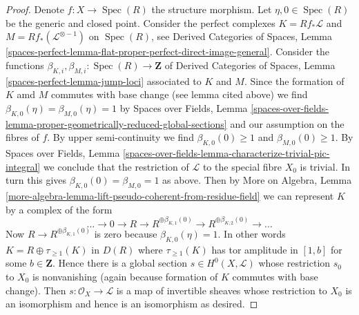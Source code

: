 \documentclass[10pt,a4paper]{amsart}
\theoremstyle{plain}
\theoremstyle{definition}
\theoremstyle{remark}
\numberwithin{equation}{subsection}
\def\Spec{\mathop{\mathrm{Spec}}}
\begin{document}
\begin{proof}
\medskip\noindent
Denote $f : X \to \Spec(R)$ the structure morphism.
Let $\eta, 0 \in \Spec(R)$ be the generic and closed point.
Consider the perfect complexes
$K = Rf_*\mathcal{L}$ and $M = Rf_*(\mathcal{L}^{\otimes -1})$
on $\Spec(R)$, see Derived Categories of Spaces, Lemma
\ref{spaces-perfect-lemma-flat-proper-perfect-direct-image-general}.
Consider the functions
$\beta_{K, i}, \beta_{M, i} : \Spec(R) \to \mathbf{Z}$
of Derived Categories of Spaces, Lemma
\ref{spaces-perfect-lemma-jump-loci} associated to $K$ and $M$.
Since the formation of $K$ amd $M$ commutes with
base change (see lemma cited above) we find
$\beta_{K, 0}(\eta) = \beta_{M, 0}(\eta) = 1$ by
Spaces over Fields, Lemma
\ref{spaces-over-fields-lemma-proper-geometrically-reduced-global-sections}
and our assumption on the fibres of $f$.
By upper semi-continuity we find
$\beta_{K, 0}(0) \geq 1$ and $\beta_{M, 0}(0) \geq 1$.
By 
Spaces over Fields, Lemma
\ref{spaces-over-fields-lemma-characterize-trivial-pic-integral}
we conclude that the restriction of $\mathcal{L}$
to the special fibre $X_0$ is trivial. In turn this gives
$\beta_{K, 0}(0) = \beta_{M, 0} = 1$ as above.
Then by More on Algebra, Lemma
\ref{more-algebra-lemma-lift-pseudo-coherent-from-residue-field}
we can represent $K$ by a complex of the form
$$
\ldots \to 0 \to R \to R^{\oplus \beta_{K, 1}(0)} \to
R^{\oplus \beta_{K, 2}(0)} \to \ldots
$$
Now $R \to R^{\oplus \beta_{K, 1}(0)}$ is zero
because $\beta_{K, 0}(\eta) = 1$. In other words
$K = R \oplus \tau_{\geq 1}(K)$ in $D(R)$ where $\tau_{\geq 1}(K)$
has tor amplitude in $[1, b]$ for some $b \in \mathbf{Z}$.
Hence there is a global section $s \in H^0(X, \mathcal{L})$
whose restriction $s_0$
to $X_0$ is nonvanishing (again because formation of $K$
commutes with base change). Then $s : \mathcal{O}_X \to \mathcal{L}$
is a map of invertible sheaves whose restriction to $X_0$
is an isomorphism and hence is an isomorphism as desired.
\end{proof}
\end{document}
